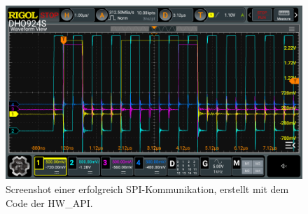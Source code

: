 \begin{figure}[H]
	\includegraphics[width=\textwidth]{Pics/spi_signal_test.png}
	\caption{Screenshot einer erfolgreich SPI-Kommunikation, erstellt mit dem Code der HW\_API.}
\end{figure}









































